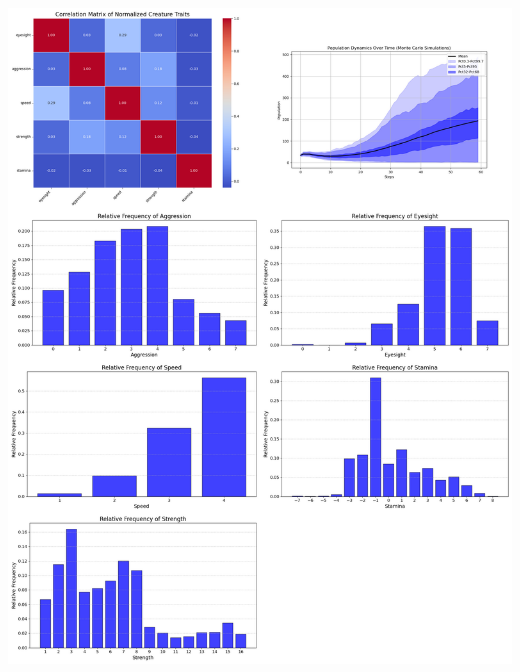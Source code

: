 \documentclass{article}
\begin{document}
\begin{center}
    \includegraphics[scale=0.21]{tests/2.4.jpg}
\end{center}
\end{document}
